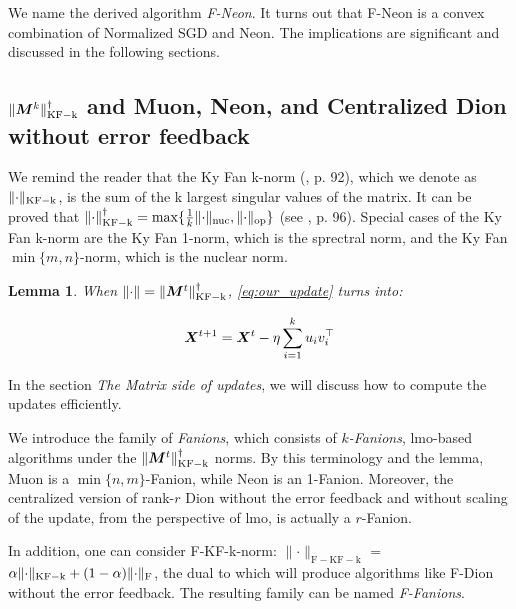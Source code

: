 \documentclass{article} %
\newtheorem{lemma}{Lemma}
\newcommand{\norm}[1]{\lVert #1\rVert}
\DeclarePairedDelimiter{\normf}{\|}{\|_\mathrm{F}}
\DeclarePairedDelimiter{\normkfk}{\|}{\|_\mathrm{KF-k}}
\DeclarePairedDelimiter{\norms}{\|}{\|_{\mathrm{op}}}
\DeclarePairedDelimiter{\normn}{\|}{\|_{\mathrm{nuc}}}
\begin{document}
        We name the derived algorithm \emph{F-Neon}. It turns out that F-Neon is a convex combination of Normalized SGD and Neon. The implications are significant and discussed in the following sections.

    
    \subsection{\texorpdfstring{$\normkfk{\mM^k}^\dagger$ and Muon, Neon, and Centralized Dion without error feedback}{Muon, Neon, and Centralized Dion without error feedback}}
        We remind the reader that the Ky Fan k-norm (\citet{bhatia2013matrix}, p. 92), which we denote as $\normkfk{\cdot}$, is the sum of the k largest singular values of the matrix. It can be proved that $\normkfk{\cdot}^\dagger = \max\{\frac{1}{k} \normn{\cdot}, \norms{\cdot}\}$ (see \citet{bhatia2013matrix}, p. 96). Special cases of the Ky Fan k-norm are the Ky Fan 1-norm, which is the sprectral norm, and the Ky Fan $\min\{m, n\}$-norm, which is the nuclear norm.

        \begin{lemma}\label{lemma:ky_fan_update}    
            When $\norm{\cdot} = \normkfk{\mM^t}^\dagger$, \cref{eq:our_update} turns into:
    
            \begin{equation}\label{eq:ky_fan_update}
                {\bm{X}}^{t+1} = {\bm{X}}^{t} - \eta \sum_{i=1}^{k}u_i v_i^\top
            \end{equation}
        \end{lemma}
        In the section {\it The Matrix side of updates}, we will discuss how to compute the updates efficiently.

        We introduce the family of {\it Fanions}, which consists of {\it $k$-Fanions}, lmo-based algorithms under the $\normkfk{\mM^t}^\dagger$ norms. By this terminology and the lemma, Muon is a $\min\{n,m\}$-Fanion, while Neon is an 1-Fanion. Moreover, the centralized version of rank-$r$ Dion \citep{ahn2025dioncommunicationefficientoptimizerlarge} without the error feedback and without scaling of the update, from the perspective of lmo, is actually a $r$-Fanion.      
        
        In addition, one can consider F-KF-k-norm: $\norm{\cdot}_{\mathrm{F-KF-k}}$ = $\alpha \normkfk{\cdot} + (1-\alpha)\normf{\cdot}$, the dual to which will produce algorithms like F-Dion without the error feedback. The resulting family can be named {\it F-Fanions}.
\end{document}
